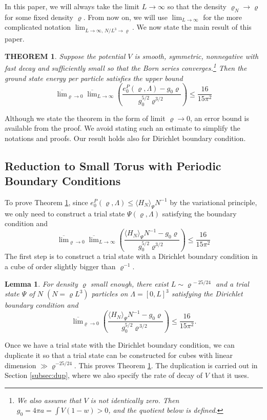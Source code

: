 \documentclass[11pt]{article}
\numberwithin{equation}{section}
\newcommand{\beq}{\begin{equation}}
\newcommand{\eeq}{\end{equation}}
\renewcommand\rho\varrho
\newtheorem{thm}{THEOREM}[section]
\newtheorem{lem}{Lemma}[section]
\theoremstyle{definition}
\begin{document}
In this paper, we will always take the limit $L \to \infty$ so that the density $\rho_N \to \rho$ 
for some fixed density $\rho$. {F}rom now on,  we will use $\lim_{L \to\infty}$  for the more complicated notation 
$\lim_{L \to \infty, \, N/L^3 \to \rho}$. We now state the main result of this paper. 


\begin{thm}\label{mainthm} 
Suppose the potential $V$ is  smooth, symmetric, nonnegative with fast decay
and sufficiently small so that the Born series converges.\footnote{We also assume that $V$ is not identically zero. Then
$g_0=4\pi a=\int V(1-w)>0$, and the quotient below is defined.}
Then the ground state energy per particle  satisfies the upper bound
\beq
\overline\lim_{\rho\to0} \overline \lim_{L \to\infty}\left(
\frac{e_0^P(\rho,\Lambda)- g_0 \rho }{g_0^{5/2} \rho ^{3/2} }\right)\leq \frac{16}{15\pi^2}
\eeq
\end{thm}
Although we state the theorem in the form of limit $\rho \to 0$, an error bound  is available from the proof. 
We avoid stating such an estimate to simplify the notations and proofs. 
Our result  holds also for Dirichlet boundary condition.

\subsection{Reduction to Small Torus with Periodic Boundary Conditions}

To prove Theorem \ref{mainthm}, since $e_0^P(\rho,\Lambda)\le \langle H_N\rangle_\Psi N^{-1}$ by the variational principle,
we only need to construct a trial state $\Psi(\rho, \Lambda)$ satisfying  the boundary condition and
\beq\label{resultpro1}
\overline\lim_{\rho\to0}\overline\lim_{L\to\infty}\left(
\frac{\langle H_N\rangle_\Psi N^{-1}-g_0\rho }{ g_0^{5/2} \rho ^{3/2}}\right)\leq \frac{16}{15\pi^2}
\eeq
%
The first step is to construct a trial state with a Dirichlet boundary condition in a cube  of order slightly bigger than $\rho^{-1}$. 
\begin{lem}\label{thm1}
For density $ \rho$ small enough, there exist $ L \sim  \rho^{\,-25/24}$ and 
 a trial state $\Psi$ of $ N$ $( N= \rho  L^3)$ particles on $ \Lambda = [0,   L]^3$ satisfying  the Dirichlet boundary condition and 
 \beq
 \overline\lim_{ \rho\to0}\left(
\frac{\langle H_{ N}\rangle_\Psi  { N}^{-1}-g_0 \rho }{ g_0^{5/2}  \rho ^{\,3/2}}\right)\leq \frac{16}{15\pi^2}.
 \eeq 
\end{lem}
Once we have a trial state with the Dirichlet boundary condition, we can duplicate it so that a trial state can be constructed for cubes
with linear dimension $  \gg  \rho^{-25/24}$. This proves Theorem \ref{mainthm}. The duplication is carried out in
Section \ref{subsec:dup}, where we also specify the rate of decay of $V$ that it uses.
\end{document}
